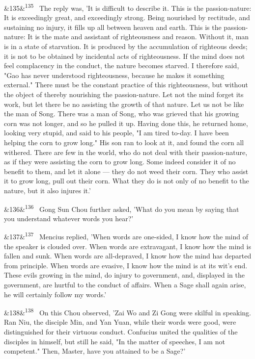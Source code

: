 \documentclass[12pt]{article}
\newcommand{\para}[1][]{\par\noindent\ifx&#1&\else\textsuperscript{\footnotesize #1}~\fi}
\begin{document}
\para[135] The reply was, 'It is difficult to describe it. This is the passion-nature: It is exceedingly great, and exceedingly strong. Being nourished by rectitude, and sustaining no injury, it fills up all between heaven and earth. This is the passion-nature: It is the mate and assistant of righteousness and reason. Without it, man is in a state of starvation. It is produced by the accumulation of righteous deeds; it is not to be obtained by incidental acts of righteousness. If the mind does not feel complacency in the conduct, the nature becomes starved. I therefore said, "Gao has never understood righteousness, because he makes it something external." There must be the constant practice of this righteousness, but without the object of thereby nourishing the passion-nature. Let not the mind forget its work, but let there be no assisting the growth of that nature. Let us not be like the man of Song. There was a man of Song, who was grieved that his growing corn was not longer, and so he pulled it up. Having done this, he returned home, looking very stupid, and said to his people, "I am tired to-day. I have been helping the corn to grow long." His son ran to look at it, and found the corn all withered. There are few in the world, who do not deal with their passion-nature, as if they were assisting the corn to grow long. Some indeed consider it of no benefit to them, and let it alone --- they do not weed their corn. They who assist it to grow long, pull out their corn. What they do is not only of no benefit to the nature, but it also injures it.'

\para[136] Gong Sun Chou further asked, 'What do you mean by saying that you understand whatever words you hear?'

\para[137] Mencius replied, 'When words are one-sided, I know how the mind of the speaker is clouded over. When words are extravagant, I know how the mind is fallen and sunk. When words are all-depraved, I know how the mind has departed from principle. When words are evasive, I know how the mind is at its wit's end. These evils growing in the mind, do injury to government, and, displayed in the government, are hurtful to the conduct of affairs. When a Sage shall again arise, he will certainly follow my words.'

\para[138] On this Chou observed, 'Zai Wo and Zi Gong were skilful in speaking. Ran Niu, the disciple Min, and Yan Yuan, while their words were good, were distinguished for their virtuous conduct. Confucius united the qualities of the disciples in himself, but still he said, "In the matter of speeches, I am not competent." Then, Master, have you attained to be a Sage?'
\end{document}

